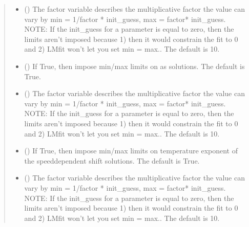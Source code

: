 \documentclass[letterpaper,10pt,english]{sphinxmanual}
\begin{document}
\begin{fulllineitems}
\begin{quote}
\begin{description}
\begin{itemize}
\item {} 
\sphinxAtStartPar
{} (\sphinxstyleliteralemphasis{\sphinxupquote{, }}) \textendash{} The factor variable describes the multiplicative factor the value can vary by min = 1/factor * init\_guess, max = factor* init\_guess. NOTE: If the init\_guess for a parameter is equal to zero, then the limits aren’t imposed because 1) then it would constrain the fit to 0 and 2) LMfit won’t let you set min = max.. The default is 10.

\item {} 
\sphinxAtStartPar
{} (\sphinxstyleliteralemphasis{\sphinxupquote{, }}) \textendash{} If True, then impose min/max limits on as solutions. The default is True.

\item {} 
\sphinxAtStartPar
{} (\sphinxstyleliteralemphasis{\sphinxupquote{, }}) \textendash{} The factor variable describes the multiplicative factor the value can vary by min = 1/factor * init\_guess, max = factor* init\_guess. NOTE: If the init\_guess for a parameter is equal to zero, then the limits aren’t imposed because 1) then it would constrain the fit to 0 and 2) LMfit won’t let you set min = max.. The default is 10.

\item {} 
\sphinxAtStartPar
{} (\sphinxstyleliteralemphasis{\sphinxupquote{, }}) \textendash{} If True, then impose min/max limits on temperature exponent of the speed\sphinxhyphen{}dependent shift solutions. The default is True.

\item {} 
\sphinxAtStartPar
{} (\sphinxstyleliteralemphasis{\sphinxupquote{, }}) \textendash{} The factor variable describes the multiplicative factor the value can vary by min = 1/factor * init\_guess, max = factor* init\_guess. NOTE: If the init\_guess for a parameter is equal to zero, then the limits aren’t imposed because 1) then it would constrain the fit to 0 and 2) LMfit won’t let you set min = max.. The default is 10.


\end{itemize}
\end{description}
\end{quote}
\end{fulllineitems}
\end{document}

